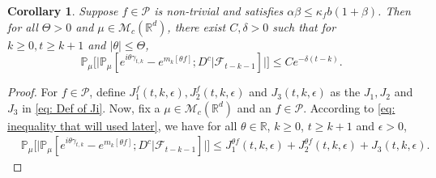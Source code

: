 \documentclass[12pt,a4paper]{amsart}
\theoremstyle{plain}
\newtheorem{cor}[thm]{Corollary}
\theoremstyle{definition}
\numberwithin{equation}{section}
\begin{document}
\begin{cor}\label{cor: used in next corollary}
   Suppose $f\in \mathcal{P}$ is non-trivial and satisfies $\alpha\beta\leq \kappa_fb(1+\beta)$.
    Then for all $\Theta >0$ and $\mu\in \mathcal M_c(\mathbb R^d)$, there exist $C, \delta>0$ such that for $k \geq 0, t\geq k+1$ and $|\theta|\leq \Theta$,
\begin{equation}
    \mathbb{P}_{\mu}\Big[\big|\mathbb{P}_{\mu}[e^{i\theta\gamma_{t,k}}-e^{m_k[\theta f]}; D^c | \mathscr F_{t-k-1}]\big|\Big]
    \leq Ce^{-\delta(t-k)}.
\end{equation}
\end{cor}
\begin{proof}
	For  $f\in \mathcal P$, define $J_1^f(t,k,\epsilon), J_2^f(t,k,\epsilon)$ and $J_3(t,k,\epsilon)$ as the $J_1, J_2$ and $J_3$ in \eqref{eq: Def of Ji}.
	Now, fix a $\mu \in \mathcal M_c(\mathbb R^d)$ and an $f\in \mathcal P$.
    According to \eqref{eq: inequality that will used later},  we have for all $\theta\in \mathbb R$, $k\geq 0$, $t\geq k+1$ and $\epsilon> 0$,
\begin{align}
    &\mathbb{P}_{\mu}\Big[\big| \mathbb{P}_{\mu}[e^{i\theta \gamma_{t,k}}-e^{m_k[\theta f]}; D^c | \mathscr F_{t-k-1}]\big|\Big]
    \leq J^{\theta f}_1(t,k,\epsilon) + J^{\theta f}_2(t,k,\epsilon)+J_3(t,k,\epsilon).
\end{align}


\end{proof}
\end{document}

